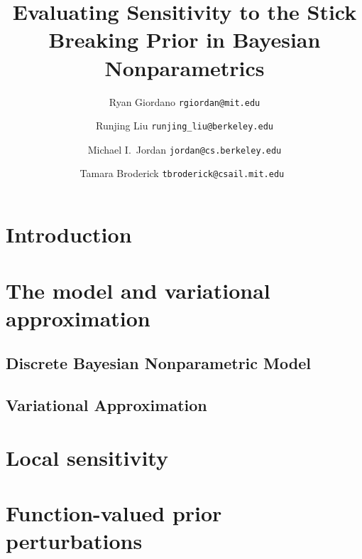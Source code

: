 \documentclass[11pt]{article}
\begin{document}



\title{Evaluating Sensitivity to the Stick Breaking Prior in Bayesian Nonparametrics}

\author{Ryan Giordano \texttt{rgiordan@mit.edu} \\
        \and
        Runjing Liu \texttt{runjing\_liu@berkeley.edu} \\
        \and
        Michael I.\ Jordan \texttt{jordan@cs.berkeley.edu} \\
        \and
        Tamara Broderick \texttt{tbroderick@csail.mit.edu }
        }

\maketitle

\begin{abstract}%

\end{abstract}


\section{Introduction}



\section{The model and variational approximation}
    \subsection{Discrete Bayesian Nonparametric Model}
    

    \subsection{Variational Approximation}
    


\section{Local sensitivity}


\section{Function-valued prior perturbations}

\end{document}
